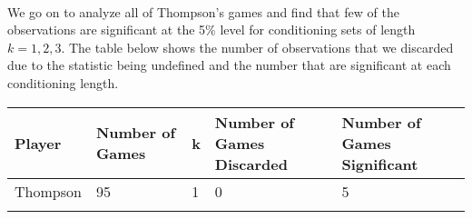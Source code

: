 \documentclass[11pt]{article}
\begin{document}
    \begin{center}
    \end{center}
    { \hspace*{\fill} \\}
    
    We go on to analyze all of Thompson's games and find that few of the
observations are significant at the 5\% level for conditioning sets of
length \(k=1,2,3\). The table below shows the number of observations
that we discarded due to the statistic being undefined and the number
that are significant at each conditioning length.

\begin{longtable}[]{@{}lllll@{}}
\toprule
\begin{minipage}[b]{0.05\columnwidth}\raggedright\strut
Player\strut
\end{minipage} & \begin{minipage}[b]{0.05\columnwidth}\raggedright\strut
Number of Games\strut
\end{minipage} & \begin{minipage}[b]{0.05\columnwidth}\raggedright\strut
k\strut
\end{minipage} & \begin{minipage}[b]{0.05\columnwidth}\raggedright\strut
Number of Games Discarded\strut
\end{minipage} & \begin{minipage}[b]{0.05\columnwidth}\raggedright\strut
Number of Games Significant\strut
\end{minipage}\tabularnewline
\midrule
\endhead
\begin{minipage}[t]{0.05\columnwidth}\raggedright\strut
Thompson\strut
\end{minipage} & \begin{minipage}[t]{0.05\columnwidth}\raggedright\strut
95\strut
\end{minipage} & \begin{minipage}[t]{0.05\columnwidth}\raggedright\strut
1\strut
\end{minipage} & \begin{minipage}[t]{0.05\columnwidth}\raggedright\strut
0\strut
\end{minipage} & \begin{minipage}[t]{0.05\columnwidth}\raggedright\strut
5\strut
\end{minipage}\tabularnewline
\begin{minipage}[t]{0.05\columnwidth}\raggedright\strut

\end{minipage}
\end{longtable}
\end{document}

